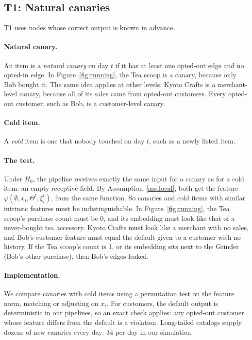 \documentclass[10pt,twocolumn,letterpaper]{article}
\theoremstyle{definition}
\begin{document}
\subsection{T1: Natural canaries}
T1 uses nodes whose correct output is known in advance.

\paragraph{Natural canary.}
An item is a \emph{natural canary} on day $t$ if it has at least one opted-out
edge and no opted-in edge. In Figure~\ref{fig:running}, the Tea scoop is a
canary, because only Bob bought it. The same idea applies at other levels.
Kyoto Crafts is a merchant-level canary, because all of its sales came from
opted-out customers. Every opted-out customer, such as Bob, is a
customer-level canary.

\paragraph{Cold item.}
A \emph{cold} item is one that nobody touched on day $t$, such as a newly listed
item.

\paragraph{The test.}
Under $H_0$, the pipeline receives exactly the same input for a canary as for a
cold item: an empty receptive field. By Assumption~\ref{ass:local}, both get
the feature $\varphi(\emptyset, x_i, \Theta^t, \xi_i^t)$, from the same function. So
canaries and cold items with similar intrinsic features must be
indistinguishable. In Figure~\ref{fig:running}, the Tea scoop's purchase count
must be 0, and its embedding must look like that of a never-bought tea
accessory. Kyoto Crafts must look like a merchant with no sales, and Bob's
customer feature must equal the default given to a customer with no history.
If the Tea scoop's count is 1, or its embedding sits next to the Grinder
(Bob's other purchase), then Bob's edges leaked.

\paragraph{Implementation.}
We compare canaries with cold items using a permutation test on the feature
norm, matching or adjusting on $x_i$. For customers, the default output is
deterministic in our pipelines, so an exact check applies: any opted-out
customer whose feature differs from the default is a violation. Long-tailed
catalogs supply dozens of new canaries every day: 34 per day in our
simulation.
\end{document}
